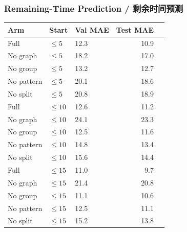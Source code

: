 \documentclass[10pt,a4paper]{article}
\begin{document}
\subsubsection{Remaining-Time Prediction / 剩余时间预测}
\begin{center}
\scriptsize
\begin{tabular}{lllrr}
\toprule
Arm & Start & Val MAE & Test MAE \\
\midrule
Full       & $\leq5$  & 12.3 & 10.9 \\
No graph   & $\leq5$  & 18.2 & 17.0 \\
No group   & $\leq5$  & 13.2 & 12.7 \\
No pattern & $\leq5$  & 20.1 & 18.6 \\
No split   & $\leq5$  & 20.8 & 18.9 \\
\midrule
Full       & $\leq10$ & 12.6 & 11.2 \\
No graph   & $\leq10$ & 24.1 & 23.3 \\
No group   & $\leq10$ & 12.5 & 11.6 \\
No pattern & $\leq10$ & 14.8 & 13.4 \\
No split   & $\leq10$ & 15.6 & 14.4 \\
\midrule
Full       & $\leq15$ & 11.0 &  9.7 \\
No graph   & $\leq15$ & 21.4 & 20.8 \\
No group   & $\leq15$ & 11.1 & 10.6 \\
No pattern & $\leq15$ & 12.5 & 11.1 \\
No split   & $\leq15$ & 15.2 & 13.8 \\
\bottomrule
\end{tabular}
\end{center}
\end{document}

